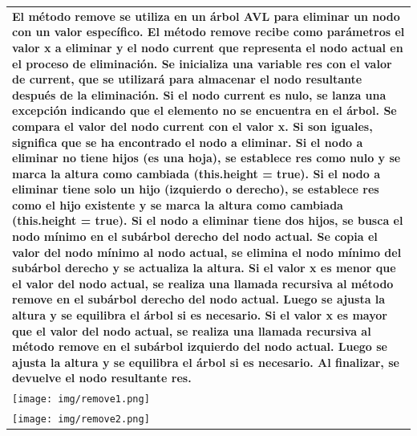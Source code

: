 \documentclass[9pt]{article}
\begin{document}
\begin{longtable}{|p{15cm}|}
		\textbf{ El método remove se utiliza en un árbol AVL para eliminar un nodo con un valor específico.
		El método remove recibe como parámetros el valor x a eliminar y el nodo current que representa el nodo actual en el proceso de eliminación.
		Se inicializa una variable res con el valor de current, que se utilizará para almacenar el nodo resultante después de la eliminación.
		Si el nodo current es nulo, se lanza una excepción indicando que el elemento no se encuentra en el árbol.
		Se compara el valor del nodo current con el valor x. Si son iguales, significa que se ha encontrado el nodo a eliminar.
		Si el nodo a eliminar no tiene hijos (es una hoja), se establece res como nulo y se marca la altura como cambiada (this.height = true).
		Si el nodo a eliminar tiene solo un hijo (izquierdo o derecho), se establece res como el hijo existente y se marca la altura como cambiada (this.height = true).
		Si el nodo a eliminar tiene dos hijos, se busca el nodo mínimo en el subárbol derecho del nodo actual. Se copia el valor del nodo mínimo al nodo actual, se elimina el nodo mínimo del subárbol derecho y se actualiza la altura.
		Si el valor x es menor que el valor del nodo actual, se realiza una llamada recursiva al método remove en el subárbol derecho del nodo actual. Luego se ajusta la altura y se equilibra el árbol si es necesario.
		Si el valor x es mayor que el valor del nodo actual, se realiza una llamada recursiva al método remove en el subárbol izquierdo del nodo actual. Luego se ajusta la altura y se equilibra el árbol si es necesario.
		Al finalizar, se devuelve el nodo resultante res.
		}\\
		\texttt{[image: img/remove1.png]}\\
		\texttt{[image: img/remove2.png]}\\


\end{longtable}
\end{document}
